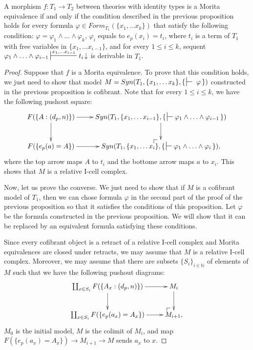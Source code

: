 \documentclass[reqno]{amsart}
\makeatletter
\theoremstyle{definition}
\theoremstyle{remark}
\newcommand{\I}{\mathrm{I}}
\numberwithin{figure}{section}
\newcommand{\po}[1][dr]{\save*!/#1+1.2pc/#1:(1,-1)@^{|-}\restore}
\makeatother
\begin{document}
\begin{prop}
A morphism $f : T_1 \to T_2$ between theories with identity types is a Morita equivalence if and only if 
the condition described in the previous proposition holds for every formula $\varphi \in Form_{T_1}(\{ x_1, \ldots x_k \})$ that satisfy the following condition:
$\varphi = \varphi_1 \land \ldots \land \varphi_k$, $\varphi_i$ equals to $e_p(x_i) = t_i$, where $t_i$ is a term of $T_1$ with free variables in $\{ x_1, \ldots x_{i-1} \}$,
and for every $1 \leq i \leq k$, sequent $\varphi_1 \land \ldots \land \varphi_{i-1} \sststile{}{x_1, \ldots x_{i-1}} t_i\!\downarrow$ is derivable in $T_1$.
\end{prop}
\begin{proof}
Suppose that $f$ is a Morita equivalence.
To prove that this condition holds, we just need to show that model $M = Syn(T_1, \{ x_1, \ldots x_k \}, \{\,\sststile{}{}~\varphi\,\})$
constructed in the previous proposition is cofibrant.
Note that for every $1 \leq i \leq k$, we have the following pushout square:
\[ \xymatrix{ F(\{ A : (d_p,n) \}) \ar[d] \ar[r] &     Syn(T_1, \{ x_1, \ldots x_{i-1} \}, \{\,\sststile{}{} \varphi_1 \land \ldots \land \varphi_{i-1} \,\}) \ar[d] \\
              F(\{ e_p(a) = A \})         \ar[r] & \po Syn(T_1, \{ x_1, \ldots x_i \}, \{\,\sststile{}{} \varphi_1 \land \ldots \land \varphi_i \,\}),
            } \]
where the top arrow maps $A$ to $t_i$ and the bottome arrow maps $a$ to $x_i$.
This shows that $M$ is a relative $\I$-cell complex.

Now, let us prove the converse.
We just need to show that if $M$ is a cofibrant model of $T_1$, then we can chose formula $\varphi$
in the second part of the proof of the previous proposition so that it satisfies the conditions of this proposition.
Let $\varphi$ be the formula constructed in the previous proposition.
We will show that it can be replaced by an equivalent formula satisfying these conditions.

Since every cofibrant object is a retract of a relative $\I$-cell complex and Morita equivalences are closed under retracts, we may assume that $M$ is a relative $\I$-cell complex.
Moreover, we may assume that there are subsets $\{S_i\}_{i \in \mathbb{N}}$ of elements of $M$ such that we have the following pushout diagrams:
\[ \xymatrix{ \coprod_{x \in S_i} F(\{ A_x : (d_p,n) \}) \ar[d] \ar[r] &     M_i \ar[d] \\
              \coprod_{x \in S_i} F(\{ e_p(a_x) = A_x \})       \ar[r] & \po M_{i+1},
            } \]
$M_0$ is the initial model, $M$ is the colimit of $M_i$, and map $F(\{ e_p(a_x) = A_x \}) \to M_{i+1} \to M$ sends $a_x$ to $x$.


\end{proof}
\end{document}
